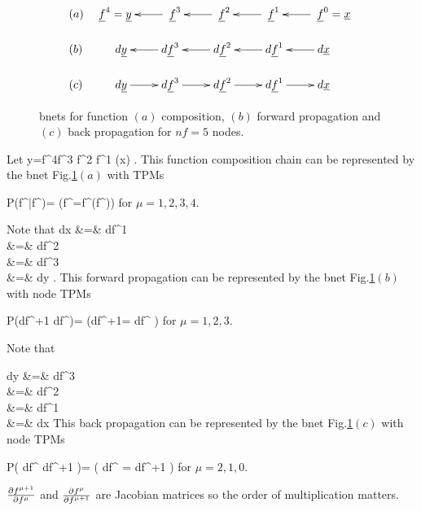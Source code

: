 \begin{figure}[h!]
\centering
$$
\begin{array}{l}
(a)\quad
\xymatrix{
\rvf^4=\rvy
&
\;\rvf^3\ar[l]
&
\;\rvf^2\ar[l]
&
\;\rvf^1\ar[l]
&
\;\rvf^0=\rvx\ar[l]
}
\\
\\
(b)\quad\quad\;\;
\xymatrix{
d\rvy
&
d\rvf^3\ar[l]
&
d\rvf^2\ar[l]
&
d\rvf^1\ar[l]
&
d\rvx\ar[l]
}
\\
\\
(c)\quad\quad\;\;
\xymatrix{
d\rvy\ar[r]
&
d\rvf^3\ar[r]
&
d\rvf^2\ar[r]
&
d\rvf^1\ar[r]
&
d\rvx
}
\end{array}
$$
\caption{bnets for function $(a)$
composition, $(b)$
forward propagation and $(c)$ back propagation
for $nf=5$ nodes.}
\label{fig-backp-abc}
\end{figure}


Let
\beq
y=f^4\circ f^3 \circ f^2 \circ f^1 (x)
\;.
\eeq
This function composition chain can be
represented by the bnet
Fig.\ref{fig-backp-abc}$(a)$
with TPMs

\beq\color{blue}
P(f^\mu|f^{})=
\indi\left(f^\mu=f^\mu(f^{})\right)
\;
\eeq
for $\mu=1, 2,3,4$.


Note that
\beqa
{}
dx
&=&
df^1
\\
&=&
df^2
\\
&=&
df^3
\\
&=&
dy
\;.
\eeqa
This forward propagation can be
represented by the bnet
Fig.\ref{fig-backp-abc}$(b)$
with node TPMs

\beq\color{blue}
P(df^{\mu+1}\mid
df^{\mu})=
\indi\left(df^{\mu+1}=
df^\mu
\right)
\eeq
for $\mu=1,2,3$.

Note that

\beqa
dy
&=&
df^3
\\
&=&
df^2
\\
&=&
df^1
\\
&=&
dx
\eeqa
This back propagation can be
represented by the bnet
Fig.\ref{fig-backp-abc}$(c)$
with node TPMs

\beq\color{blue}
P(
df^{\mu}
\mid
df^{\mu+1}
)=
\indi\left(
df^{\mu}
=
df^{\mu+1}
\right)
\eeq
for $\mu=2,1,0$.

$\frac{\partial f^{\mu+1}}{\partial f^{\mu}}$
and $\frac{\partial f^{\mu}}{\partial f^{\mu+1}}$
are Jacobian matrices 
so the order of multiplication
matters.

